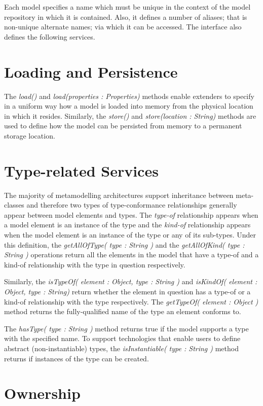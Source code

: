 Each model specifies a name which must be unique in the context of the model repository in which it is contained. Also, it defines a number of aliases; that is non-unique alternate names; via which it can be accessed. The interface also defines the following services.

\section{Loading and Persistence}

The \emph{load()} and \emph{load(properties : Properties)} methods enable extenders to specify in a uniform way how a model is loaded into memory from the physical location in which it resides. Similarly, the \emph{store()} and \emph{store(location : String)} methods are used to define how the model can be persisted from memory to a permanent storage location.

\section{Type-related Services}

The majority of metamodelling architectures support inheritance between meta-classes and therefore two types of type-conformance relationships generally appear between model elements and types. The \emph{type-of} relationship appears when a model element is an instance of the type and the \emph{kind-of} relationship appears when the model element is an instance of the type or any of its sub-types. Under this definition, the \emph{getAllOfType( type : String )} and the \emph{getAllOfKind( type : String )} operations return all the elements in the model that have a type-of and a kind-of relationship with the type in question respectively.

Similarly, the \emph{isTypeOf( element : Object, type : String )} and \emph{isKindOf( element : Object, type : String)} return whether the element in question has a type-of or a kind-of relationship with the type respectively. The \emph{getTypeOf( element : Object )} method returns the fully-qualified name of the type an element conforms to.

The \emph{hasType( type : String )} method returns true if the model supports a type with the specified name. To support technologies that enable users to define abstract (non-instantiable) types, the \emph{isInstantiable( type : String )} method returns if instances of the type can be created.

\section{Ownership}

